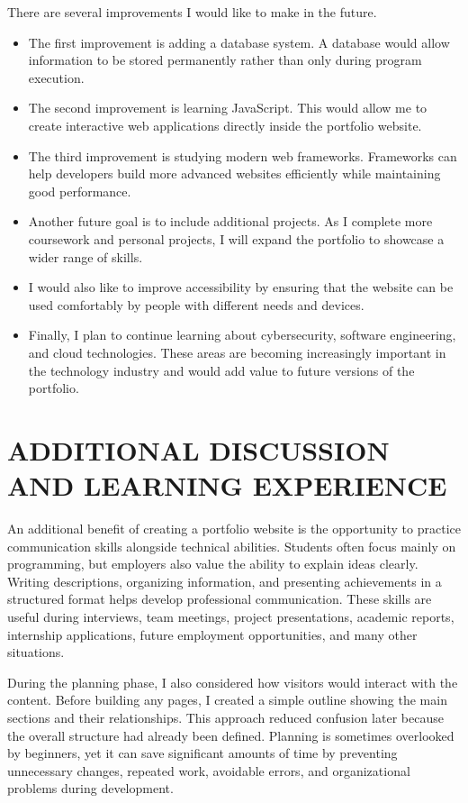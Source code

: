 \documentclass[12pt]{article}
\begin{document}
There are several improvements I would like to make in the future.
\begin{itemize}
    \item The first improvement is adding a database system. A database would allow information to be stored permanently rather than only during program execution.
    \item The second improvement is learning JavaScript. This would allow me to create interactive web applications directly inside the portfolio website.
    \item The third improvement is studying modern web frameworks. Frameworks can help developers build more advanced websites efficiently while maintaining good performance.
    \item Another future goal is to include additional projects. As I complete more coursework and personal projects, I will expand the portfolio to showcase a wider range of skills.
    \item I would also like to improve accessibility by ensuring that the website can be used comfortably by people with different needs and devices.
    \item Finally, I plan to continue learning about cybersecurity, software engineering, and cloud technologies. These areas are becoming increasingly important in the technology industry and would add value to future versions of the portfolio.
\end{itemize}

\section*{ADDITIONAL DISCUSSION AND LEARNING EXPERIENCE}
An additional benefit of creating a portfolio website is the opportunity to practice communication skills alongside technical abilities. Students often focus mainly on programming, but employers also value the ability to explain ideas clearly. Writing descriptions, organizing information, and presenting achievements in a structured format helps develop professional communication. These skills are useful during interviews, team meetings, project presentations, academic reports, internship applications, future employment opportunities, and many other situations.

During the planning phase, I also considered how visitors would interact with the content. Before building any pages, I created a simple outline showing the main sections and their relationships. This approach reduced confusion later because the overall structure had already been defined. Planning is sometimes overlooked by beginners, yet it can save significant amounts of time by preventing unnecessary changes, repeated work, avoidable errors, and organizational problems during development.
\end{document}
